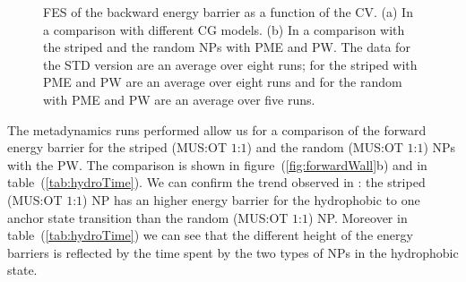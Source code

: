 \begin{figure}[pth]
\begin{adjustwidth}{-1.5cm}{-0.5cm}
		\caption{\acs{FES} of the backward energy barrier as a function of the \acs{CV}. (a) In a comparison with different \acs{CG} models. (b) In a comparison with the striped and the random \acp{NP} with \acs{PME} and \acs{PW}. The data for the STD version are an average over eight runs; for the striped with \ac{PME} and \acs{PW} are an average over eight runs and for the random with \ac{PME} and \acs{PW} are an average over five runs.}%
		\label{fig:backwardWall}
	\end{adjustwidth}
\end{figure}

The metadynamics runs performed allow us for a comparison of the forward energy barrier for the striped 
(\ac{MUS}:\ac{OT} $1$:$1$) and the random (\ac{MUS}:\ac{OT} $1$:$1$) \acp{NP} with the \ac{PW}. The comparison is 
shown in figure~(\ref{fig:forwardWall}b) and in table~(\ref{tab:hydroTime}). We can confirm the trend observed in 
\cite{ourPaper}: the striped (\ac{MUS}:\ac{OT} $1$:$1$) \ac{NP} has an higher energy barrier for the hydrophobic 
to one anchor state transition than the random (\ac{MUS}:\ac{OT} $1$:$1$) \ac{NP}. Moreover in 
table~(\ref{tab:hydroTime}) we can see that the different height of the energy barriers is reflected by the time 
spent by the two types of \acp{NP} in the hydrophobic state.

